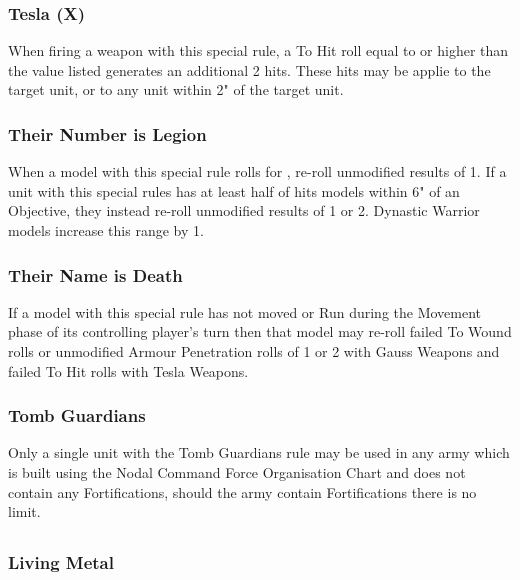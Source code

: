 \begin{multicols}{2}
\subsubsection{Tesla (X)} \label{Tesla}

When firing a weapon with this special rule, a To Hit roll equal to or higher than the value listed generates an additional 2 hits. These hits may be applie to the target unit, or to any unit within 2" of the target unit.

\subsubsection{Their Number is Legion} \label{Their Number is Legion}

When a model with this special rule rolls for , re-roll unmodified results of 1. If a unit with this special rules has at least half of hits models within 6" of an Objective, they instead re-roll unmodified results of 1 or 2. Dynastic Warrior models increase this range by 1.

\subsubsection{Their Name is Death} \label{Their Name is Death}

If a model with this special rule has not moved or Run during the Movement phase of its controlling player’s turn then that model may re-roll failed To Wound rolls or unmodified Armour Penetration rolls of 1 or 2 with Gauss Weapons and failed To Hit rolls with Tesla Weapons.

\subsubsection{Tomb Guardians} \label{Tomb Guardians}

Only a single unit with the Tomb Guardians rule may be used in any army which is built using the Nodal Command Force Organisation Chart and does not contain any Fortifications, should the army contain Fortifications there is no limit.

\end{multicols}

\subsection[Unit Subtypes]{}

\subsubsection{Living Metal} \label{Living Metal}

